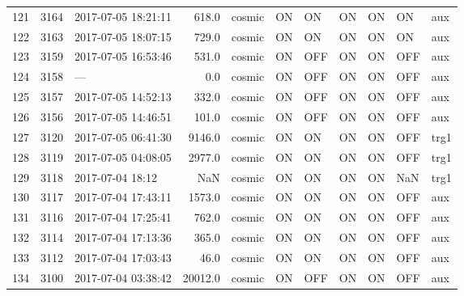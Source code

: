 \begin{longtable}{lrlrlllllll}
121 &  3164 &  2017-07-05 18:21:11 &     618.0 &   cosmic &  ON &   ON &   ON &  ON &   ON &       aux\\
122 &  3163 &  2017-07-05 18:07:15 &     729.0 &   cosmic &  ON &   ON &   ON &  ON &   ON &       aux\\
123 &  3159 &  2017-07-05 16:53:46 &     531.0 &   cosmic &  ON &  OFF &   ON &  ON &  OFF &       aux\\
124 &  3158 &                  --- &       0.0 &   cosmic &  ON &  OFF &   ON &  ON &  OFF &       aux\\
125 &  3157 &  2017-07-05 14:52:13 &     332.0 &   cosmic &  ON &  OFF &   ON &  ON &  OFF &       aux\\
126 &  3156 &  2017-07-05 14:46:51 &     101.0 &   cosmic &  ON &  OFF &   ON &  ON &  OFF &       aux\\
127 &  3120 &  2017-07-05 06:41:30 &    9146.0 &   cosmic &  ON &   ON &   ON &  ON &  OFF &      trg1\\
128 &  3119 &  2017-07-05 04:08:05 &    2977.0 &   cosmic &  ON &   ON &   ON &  ON &  OFF &      trg1\\
129 &  3118 &     2017-07-04 18:12 &       NaN &   cosmic &  ON &   ON &   ON &  ON &  NaN &      trg1\\
130 &  3117 &  2017-07-04 17:43:11 &    1573.0 &   cosmic &  ON &   ON &   ON &  ON &  OFF &       aux\\
131 &  3116 &  2017-07-04 17:25:41 &     762.0 &   cosmic &  ON &   ON &   ON &  ON &  OFF &       aux\\
132 &  3114 &  2017-07-04 17:13:36 &     365.0 &   cosmic &  ON &   ON &   ON &  ON &  OFF &       aux\\
133 &  3112 &  2017-07-04 17:03:43 &      46.0 &   cosmic &  ON &   ON &   ON &  ON &  OFF &       aux\\
134 &  3100 &  2017-07-04 03:38:42 &   20012.0 &   cosmic &  ON &  OFF &   ON &  ON &  OFF &       aux\\
\bottomrule
\end{longtable}

